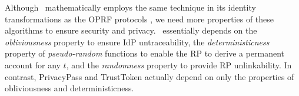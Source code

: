 Although \usso\ mathematically employs the same technique in its identity transformations as the OPRF protocols \cite{oprf-proved,voprf-proved}, we need more properties of these algorithms to ensure security and privacy. %
\usso\ essentially depends on the \emph{obliviousness} property to ensure IdP untraceability, %
the \emph{deterministicness} property of \emph{pseudo-random} functions to enable the RP to derive a permanent account for any $t$, and the \emph{randomness} property to provide RP unlinkability. %
In contrast, PrivacyPass and TrustToken \cite{privacypass,trusttoken} actually depend on only the properties of obliviousness and deterministicness.

